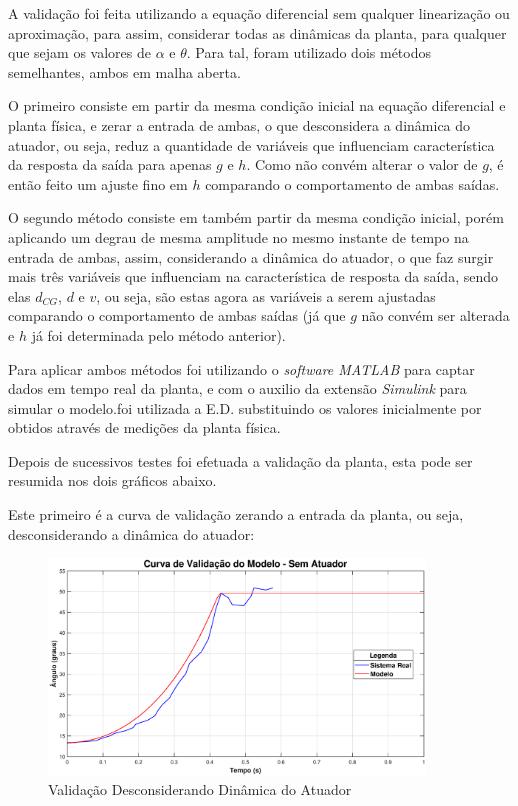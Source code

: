 \documentclass[conference,harvard,brazil,english]{sbatex}
\begin{document}
            A validação foi feita utilizando a equação diferencial sem qualquer linearização ou aproximação, para assim, considerar todas as dinâmicas da planta, para qualquer que sejam os valores de $\alpha$ e $\theta$. Para tal, foram utilizado dois métodos semelhantes, ambos em malha aberta.
            
            O primeiro consiste em partir da mesma condição inicial na equação diferencial e planta física, e zerar a entrada de ambas, o que desconsidera a dinâmica do atuador, ou seja, reduz a quantidade de variáveis que influenciam característica da resposta da saída para apenas $g$ e $h$. Como não convém alterar o valor de $g$, é então feito um ajuste fino em $h$ comparando o comportamento de ambas saídas.
            
            O segundo método consiste em também partir da mesma condição inicial, porém aplicando um degrau de mesma amplitude no mesmo instante de tempo na entrada de ambas, assim, considerando a dinâmica do atuador, o que faz surgir mais três variáveis que influenciam na característica de resposta da saída, sendo elas $d_{CG}$, $d$ e $v$, ou seja, são estas agora as variáveis a serem ajustadas comparando o comportamento de ambas saídas (já que  $g$ não convém ser alterada e $h$ já foi determinada pelo método anterior).
            
            Para aplicar ambos métodos foi utilizando o \textit{software MATLAB} para captar dados em tempo real da planta, e com o auxilio da extensão \textit{Simulink} para simular o modelo.foi utilizada a E.D. substituindo os valores inicialmente por obtidos através de medições da planta física. 
            
            Depois de sucessivos testes foi efetuada a validação da planta, esta pode ser resumida nos dois gráficos abaixo. 
            
            Este primeiro é a curva de validação zerando a entrada da planta, ou seja, desconsiderando a dinâmica do atuador: 
            
            \begin{figure}[h]
                \hspace{-15mm}
                \includegraphics[width=10cm]{imagens/graficos/ValidacaoSemAtuador.eps}
                \caption{Validação Desconsiderando Dinâmica do Atuador}
            \end{figure}
            
\end{document}
